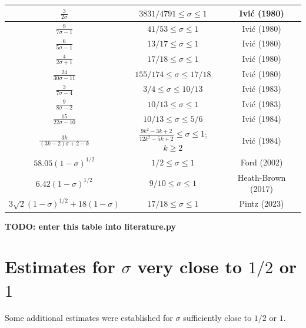 \begin{table}[ht]
\begin{tabular}{|c|c|c|}
    \hline
    $\frac{3}{2\sigma}$ & $3831/4791 \leq \sigma \leq 1$ & Ivi\'c (1980) \cite{ivic_exponent_pairs}  \\
    \hline
    $\frac{9}{7\sigma-1}$ & $41/53 \leq \sigma \leq 1$ & Ivi\'c (1980) \cite{ivic_exponent_pairs} \\
    \hline
    $\frac{6}{5\sigma-1}$ & $13/17 \leq \sigma \leq 1$ & Ivi\'c (1980) \cite{ivic_exponent_pairs} \\
    \hline
    $\frac{4}{2\sigma+1}$ & $17/18 \leq \sigma \leq 1$ & Ivi\'c (1980) \cite{ivic_exponent_pairs} \\
    \hline
    $\frac{24}{30\sigma-11}$ & $155/174 \leq \sigma \leq 17/18$ & Ivi\'c (1980) \cite{ivic_exponent_pairs} \\
    \hline
    $\frac{3}{7\sigma-4}$ & $3/4 \leq \sigma \leq 10/13$ & Ivi\'c (1983) \cite{ivic_topics_1983} \\
    \hline
    $\frac{9}{8\sigma-2}$ & $10/13 \leq \sigma \leq 1$ & Ivi\'c (1983) \cite{ivic_topics_1983} \\
    \hline
    $\frac{15}{22\sigma-10}$ & $10/13 \leq \sigma \leq 5/6$ & Ivi\'c (1984) \cite{ivic_zero_1984} \\
    \hline
    $\frac{3k}{(3k-2)\sigma+2-k}$ & $\frac{9k^2 -3k + 2}{12k^2 -5k + 2} \leq \sigma \leq 1$; $k \geq 2$ & Ivi\'c (1984) \cite{ivic_zero_1984} \\
    \hline
    $58.05 (1-\sigma)^{1/2}$ & $1/2 \leq \sigma \leq 1$ & Ford (2002) \cite{FordZeta} \\
    \hline
    $6.42 (1-\sigma)^{1/2}$ & $9/10 \leq \sigma \leq 1$ & Heath-Brown (2017) \cite{heathbrown_new_2017} \\
    \hline
    $3\sqrt{2}(1-\sigma)^{1/2}+18(1-\sigma)$ & $17/18 \leq \sigma \leq 1$ & Pintz (2023) \cite{pintz_density_2023}\\
    \hline
    \end{tabular}
    \label{zero_density_historical}
    \end{table}

{\bf TODO: enter this table into literature.py}

\section{Estimates for \texorpdfstring{$\sigma$}{sigma} very close to \texorpdfstring{$1/2$}{1/2} or \texorpdfstring{$1$}{1}}

Some additional estimates were established for $\sigma$ sufficiently close to $1/2$ or $1$.

